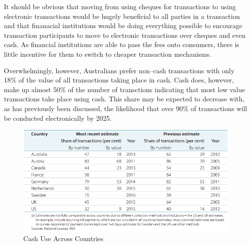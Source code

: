 It should be obvious that moving from using cheques for transactions to using electronic transactions would be hugely beneficial to all parties in a transaction and that finanacial institutions would be doing everything possible to encourage transaction participants to move to electronic transactions over cheques and even cash. As financial institutions are able to pass the fees onto consumers, there is little incentive for them to switch to cheaper transaction mechanisms.

Overwhelmingly, however, Australians prefer non--cash transactions with only 18\% of the value of all transactions taking place in cash. Cash does, however, make up almost 50\% of the number of transctions indicating that most low value transactions take place using cash. This share may be expected to decrease with, as has previously been discussed, the likelihood that over 90\% of transactions will be conducted electronically by 2025\cite{RefWorks:262}.

\begin{figure}
\includegraphics[scale=0.75]{figures/CashUseAcrossCountries.png}
\caption{Cash Use Across Countries\cite{RefWorks:270}}
\end{figure}


